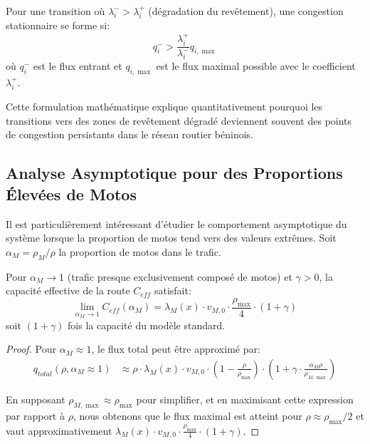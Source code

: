\begin{theorem}
Pour une transition où $\lambda_i^- > \lambda_i^+$ (dégradation du revêtement), une congestion stationnaire se forme si:
\begin{equation}
q_i^- > \frac{\lambda_i^+}{\lambda_i^-} q_{i,\max}
\end{equation}
où $q_i^-$ est le flux entrant et $q_{i,\max}$ est le flux maximal possible avec le coefficient $\lambda_i^+$.
\end{theorem}

Cette formulation mathématique explique quantitativement pourquoi les transitions vers des zones de revêtement dégradé deviennent souvent des points de congestion persistants dans le réseau routier béninois.

\subsection{Analyse Asymptotique pour des Proportions Élevées de Motos}
\label{subsec:analyse_asymptotique}

Il est particulièrement intéressant d'étudier le comportement asymptotique du système lorsque la proportion de motos tend vers des valeurs extrêmes. Soit $\alpha_M = \rho_M/\rho$ la proportion de motos dans le trafic.

\begin{theorem}
Pour $\alpha_M \to 1$ (trafic presque exclusivement composé de motos) et $\gamma > 0$, la capacité effective de la route $C_{eff}$ satisfait:
\begin{equation}
\lim_{\alpha_M \to 1} C_{eff}(\alpha_M) = \lambda_M(x) \cdot v_{M,0} \cdot \frac{\rho_{\max}}{4} \cdot (1 + \gamma)
\end{equation}
soit $(1 + \gamma)$ fois la capacité du modèle standard.
\end{theorem}

\begin{proof}
Pour $\alpha_M \approx 1$, le flux total peut être approximé par:
\begin{align}
q_{total}(\rho, \alpha_M \approx 1) &\approx \rho \cdot \lambda_M(x) \cdot v_{M,0} \cdot \left(1 - \frac{\rho}{\rho_{\max}}\right) \cdot \left(1 + \gamma \cdot \frac{\alpha_M \rho}{\rho_{M,\max}}\right)
\end{align}

En supposant $\rho_{M,\max} \approx \rho_{\max}$ pour simplifier, et en maximisant cette expression par rapport à $\rho$, nous obtenons que le flux maximal est atteint pour $\rho \approx \rho_{\max}/2$ et vaut approximativement $\lambda_M(x) \cdot v_{M,0} \cdot \frac{\rho_{\max}}{4} \cdot (1 + \gamma)$.
\end{proof}

